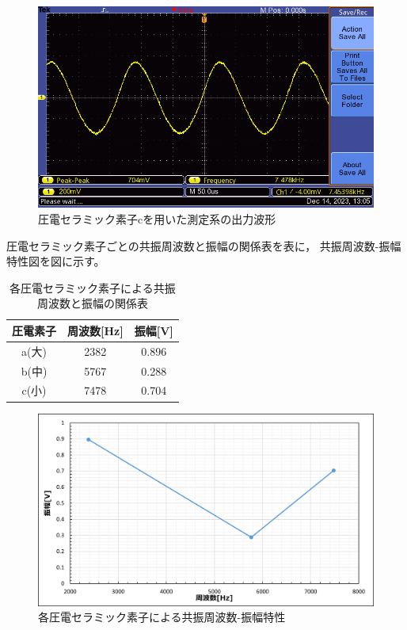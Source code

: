 \documentclass{ltjsarticle}
\begin{document}
		\begin{figure}[H]
		\centering
		\includegraphics[width = 12cm]{figs/week4small.png}
		\caption{圧電セラミック素子cを用いた測定系の出力波形}
		\label{fig:圧電c}
		\end{figure}

		圧電セラミック素子ごとの共振周波数と振幅の関係表を表に，
		共振周波数-振幅特性図を図に示す。
		\begin{table}[H]
		\begin{center}
		\caption{各圧電セラミック素子による共振周波数と振幅の関係表}
		\label{tab:各圧電セラミック素子}
		\begin{tabular}{c|cc} \toprule
		圧電素子& 周波数[Hz]& 振幅[V] \\ \hline
		a(大) & 2382 & 0.896 \\
		b(中) & 5767 & 0.288 \\
		c(小) & 7478 & 0.704 \\ \bottomrule
		\end{tabular}
		\end{center}
		\end{table}

		\begin{figure}[H]
		\centering
		\includegraphics[width = 12cm]{figs/week4-1.png}
		\caption{各圧電セラミック素子による共振周波数-振幅特性}
		\label{fig:各圧電セラミック素子}
		\end{figure}
\end{document}
